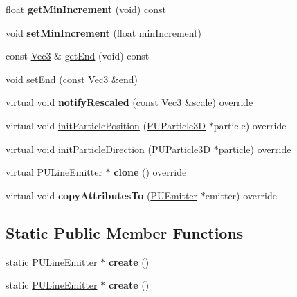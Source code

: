 \begin{DoxyCompactItemize}
float {\bfseries get\+Min\+Increment} (void) const
\item 
\mbox{\label{classPULineEmitter_adc7fc30d71ce4089a8501e458655acd8}} 
void {\bfseries set\+Min\+Increment} (float min\+Increment)
\item 
const \hyperlink{classVec3}{Vec3} \& \hyperlink{classPULineEmitter_abe794d225bfad8ad0078ffd99599c559}{get\+End} (void) const
\item 
void \hyperlink{classPULineEmitter_ab52d86f473828f9e37f0a59244a02f43}{set\+End} (const \hyperlink{classVec3}{Vec3} \&end)
\item 
\mbox{\label{classPULineEmitter_a468415770d360bbca5aed3e358c6777b}} 
virtual void {\bfseries notify\+Rescaled} (const \hyperlink{classVec3}{Vec3} \&scale) override
\item 
virtual void \hyperlink{classPULineEmitter_af448c4a0d07befdcdd1d28d7fddacb03}{init\+Particle\+Position} (\hyperlink{structPUParticle3D}{P\+U\+Particle3D} $\ast$particle) override
\item 
virtual void \hyperlink{classPULineEmitter_a5caf11b317242d3b6b58f99c7a3de0ed}{init\+Particle\+Direction} (\hyperlink{structPUParticle3D}{P\+U\+Particle3D} $\ast$particle) override
\item 
\mbox{\label{classPULineEmitter_a7f4720f28fd664b3de71b2fa88d712f2}} 
virtual \hyperlink{classPULineEmitter}{P\+U\+Line\+Emitter} $\ast$ {\bfseries clone} () override
\item 
\mbox{\label{classPULineEmitter_a158f7d6e5bb9c8d82cc3f5e38defa789}} 
virtual void {\bfseries copy\+Attributes\+To} (\hyperlink{classPUEmitter}{P\+U\+Emitter} $\ast$emitter) override
\end{DoxyCompactItemize}
\subsection*{Static Public Member Functions}
\begin{DoxyCompactItemize}
\item 
\mbox{\label{classPULineEmitter_a012cba38e429119202b8e6e5c3334b3e}} 
static \hyperlink{classPULineEmitter}{P\+U\+Line\+Emitter} $\ast$ {\bfseries create} ()
\item 
\mbox{\label{classPULineEmitter_aea69b2b31bdc0917615e5db20e594a1d}} 
static \hyperlink{classPULineEmitter}{P\+U\+Line\+Emitter} $\ast$ {\bfseries create} ()
\end{DoxyCompactItemize}
